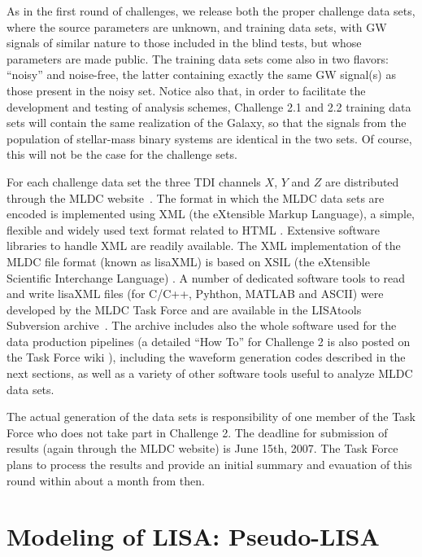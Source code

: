 \documentclass[12pt]{iopart}
\begin{document}
As in the first round of challenges, we release both the proper challenge data sets, where the source parameters are unknown, and training data sets, with GW signals of similar nature to those included in the blind tests, but whose parameters are made public. The training data sets come also in two flavors: ``noisy'' and noise-free, the latter containing exactly the same GW signal(s) as those present in the noisy set. Notice also that, in order to facilitate the development and testing of analysis schemes, Challenge 2.1 and 2.2 training data sets will contain the same realization of the Galaxy, so that the signals from the population of stellar-mass binary systems are identical in the two sets. Of course, this will not be the case for the challenge sets. 

For each challenge data set the three TDI channels $X$, $Y$ and $Z$ are distributed through the MLDC website~\cite{MLDCweb}. The format in which the MLDC data sets are encoded is implemented using XML (the eXtensible Markup Language), a simple, flexible and widely used text format related to HTML \cite{xml}. Extensive software libraries to handle XML are readily available. The XML implementation of the MLDC file format (known as lisaXML) is based on XSIL (the eXtensible Scientific Interchange Language) \cite{xsil}. A number of dedicated software tools to read and write lisaXML files (for C/C++, Pyhthon, MATLAB and ASCII) were developed by the MLDC Task Force and are available in the LISAtools Subversion archive~\cite{lisatools}. The archive includes also the whole software used for the data production pipelines (a detailed ``How To'' for Challenge 2 is also posted on the Task Force wiki \cite{MLDCwiki}), including the waveform generation codes described in the next sections, as well as a variety of other software tools useful to analyze MLDC data sets.

The actual generation of the data sets is responsibility of one member of the Task Force who does not take part in Challenge 2. The deadline for submission of results (again through the MLDC website) is June 15th, 2007. The Task Force plans to process the results and provide an initial summary and evauation of this round within about a month from then.

\section{Modeling of LISA: Pseudo-LISA}
\label{s:lisa}
\end{document}
